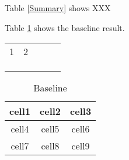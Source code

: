 \documentclass{article}
\begin{document}
\listoftables
\clearpage

Table \ref{Summary} shows XXX

Table \ref{Baseline} shows the baseline result.


\begin{table}[]
\begin{tabular}{lllll}
 1& 2 &  &  &  \\
 &  &  &  &  \\
 &  &  &  &  \\
 &  &  &  & 
\end{tabular}
\end{table}

\begin{table}[h]
    \centering
    \begin{tabular}{|c| c| c| }
         \hline
         cell1 & cell2 & cell3 \\ 
         \hline
         cell4 & cell5 & cell6 \\  
         \hline
         cell7 & cell8 & cell9   \\
         \hline
    \end{tabular}
    \caption{Baseline}
    \label{Baseline}
\end{table}
\end{document}

